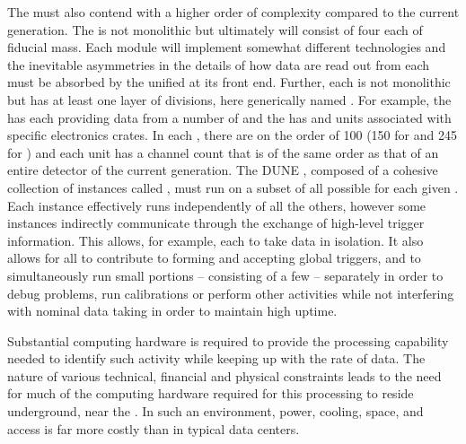 The %
 must also contend with a higher order of
complexity compared to the current generation. 
The  is not monolithic but ultimately will consist
of four  each of \nominalmodsize fiducial mass. 
Each module will %
implement somewhat different %
technologies and the
inevitable asymmetries in the details of how data are read out from
each must be absorbed by the unified  at its front end. 
Further, each  is not monolithic but has at least one
layer of divisions, here generically named . 
For example, the   has  each
providing data from a number of  and the   has
 and  units associated with specific electronics
crates.
In each , there are on the order of \num{100} 
(\num{150} for  and \num{245} for ) and each unit has a
channel count that is of the same order as that of an entire \lartpc
detector of the current generation.
The DUNE , composed of a cohesive collection of  instances
called
, must run on a subset of all possible
 for each given . 
Each instance effectively runs independently of all the others, however
some instances indirectly communicate through the exchange of
high-level trigger information. 
This allows, for example, each  to take data in
isolation. It also allows for all  to contribute to forming and
accepting global  triggers, and to simultaneously run small portions -- consisting of a few  -- separately in
order to debug problems, run calibrations or %
 perform other activities while not interfering with nominal data taking in order to maintain high uptime.

Substantial computing hardware is required to provide the processing
capability needed to identify such activity while keeping up with the
rate of data.
The nature of various technical, financial and physical constraints
leads to the need for much of the computing hardware 
required for this processing
to reside underground, near the . 
In such an environment, power, cooling, space, and access is far more
costly than in typical data centers. %


